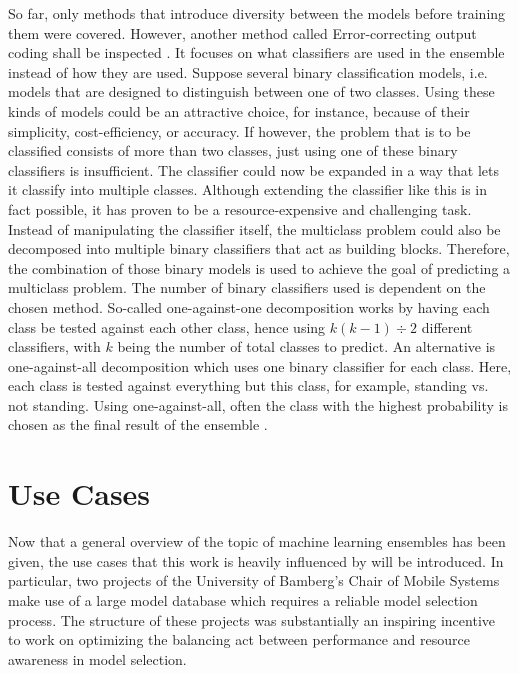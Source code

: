 So far, only methods that introduce diversity between the models before training them were covered. However, another method called Error-correcting output coding shall be inspected \cite{rokach2010}. It focuses on what classifiers are used in the ensemble instead of how they are used. Suppose several binary classification models, i.e. models that are designed to distinguish between one of two classes. Using these kinds of models could be an attractive choice, for instance, because of their simplicity, cost-efficiency, or accuracy. If however, the problem that is to be classified consists of more than two classes, just using one of these binary classifiers is insufficient. The classifier could now be expanded in a way that lets it classify into multiple classes. Although extending the classifier like this is in fact possible, it has proven to be a resource-expensive and challenging task. Instead of manipulating the classifier itself, the multiclass problem could also be decomposed into multiple binary classifiers that act as building blocks. Therefore, the combination of those binary models is used to achieve the goal of predicting a multiclass problem. The number of binary classifiers used is dependent on the chosen method. So-called one-against-one decomposition works by having each class be tested against each other class, hence using $k(k-1)\div 2$ different classifiers, with $k$ being the number of total classes to predict. An alternative is one-against-all decomposition which uses one binary classifier for each class. Here, each class is tested against everything but this class, for example, standing vs. not standing. Using one-against-all, often the class with the highest probability is chosen as the final result of the ensemble \cite{rokach2010}. 



\section{Use Cases}

Now that a general overview of the topic of machine learning ensembles has been given, the use cases that this work is heavily influenced by will be introduced. In particular, two projects of the University of Bamberg’s Chair of Mobile Systems make use of a large model database which requires a reliable model selection process. The structure of these projects was substantially an inspiring incentive to work on optimizing the balancing act between performance and resource awareness in model selection.

